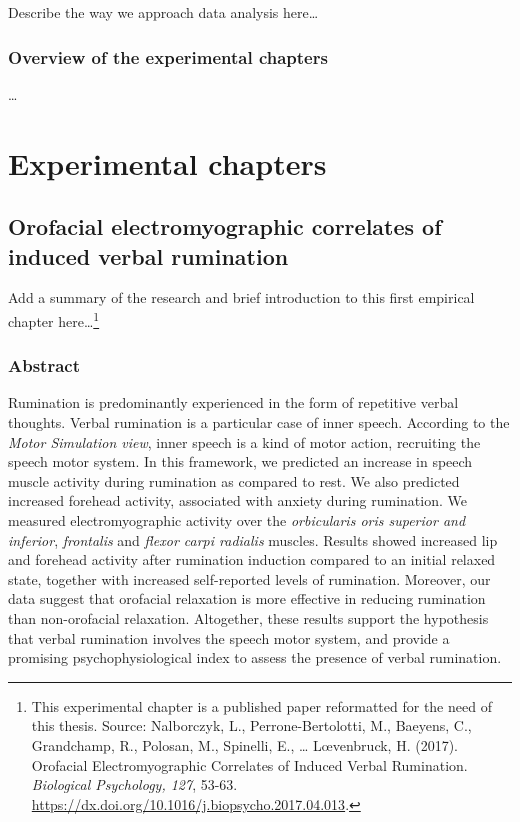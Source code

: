 \documentclass[a4paper,12pt,twoside,openright,oldfontcommands]{memoir}
\let\rmarkdownfootnote\footnote%
\def\footnote{\protect\rmarkdownfootnote}
\begin{document}
Describe the way we approach data analysis here\ldots{}

\section{Overview of the experimental
chapters}\label{overview-of-the-experimental-chapters}

\ldots{}

\part{Experimental
chapters}\label{part-experimental-chapters}

\chapter{Orofacial electromyographic correlates of induced verbal
rumination}\label{orofacial-electromyographic-correlates-of-induced-verbal-rumination}

Add a summary of the research and brief introduction to this first
empirical chapter here\ldots{}\footnote{This experimental chapter is a
  published paper reformatted for the need of this thesis. Source:
  Nalborczyk, L., Perrone-Bertolotti, M., Baeyens, C., Grandchamp, R.,
  Polosan, M., Spinelli, E., \ldots{} L\oe venbruck, H. (2017).
  Orofacial Electromyographic Correlates of Induced Verbal Rumination.
  \emph{Biological Psychology, 127}, 53-63.
  \url{https://dx.doi.org/10.1016/j.biopsycho.2017.04.013}.}

\section{Abstract}\label{abstract-1}

Rumination is predominantly experienced in the form of repetitive verbal
thoughts. Verbal rumination is a particular case of inner speech.
According to the \emph{Motor Simulation view}, inner speech is a kind of
motor action, recruiting the speech motor system. In this framework, we
predicted an increase in speech muscle activity during rumination as
compared to rest. We also predicted increased forehead activity,
associated with anxiety during rumination. We measured electromyographic
activity over the \emph{orbicularis oris superior and inferior},
\emph{frontalis} and \emph{flexor carpi radialis} muscles. Results
showed increased lip and forehead activity after rumination induction
compared to an initial relaxed state, together with increased
self-reported levels of rumination. Moreover, our data suggest that
orofacial relaxation is more effective in reducing rumination than
non-orofacial relaxation. Altogether, these results support the
hypothesis that verbal rumination involves the speech motor system, and
provide a promising psychophysiological index to assess the presence of
verbal rumination.
\end{document}
